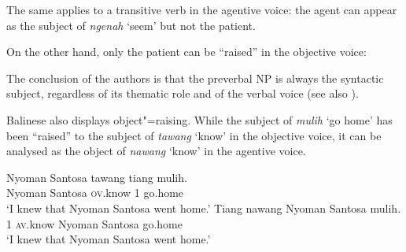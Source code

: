\documentclass[output=paper
	        ,collection
	        ,collectionchapter
 	        ,biblatex
                ,babelshorthands
                ,newtxmath
                ,draftmode
                ,colorlinks, citecolor=brown
]{./langsci/langscibook}
\begin{document}
The same applies to a transitive verb in the agentive voice: the agent can appear as the subject of \emph{ngenah} `seem' but not the patient.

\eal
{}
\zl

On the other hand, only the patient can be ``raised'' in the objective voice:

\eal
{}
\zl

The conclusion of the authors is that the preverbal NP is always the syntactic subject, regardless of its thematic role and of the verbal voice (see also \citealt{ManningandSag1998}).

Balinese also displays object"=raising. While the subject of \emph{mulih} `go home' has been ``raised'' to the
subject of \emph{tawang} `know' in the objective voice, it can be analysed as the object of \emph{nawang} `know' in the agentive
voice.

\begin{exe}
\ex \begin{xlist}
\ex 
\gll Nyoman Santosa tawang           tiang  mulih.\\
     Nyoman Santosa \textsc{ov}.know 1      go.home\\\hfill\citep[ex 22]{WechslerandArka1998}
\glt `I knew that Nyoman Santosa went home.'
\ex 
\gll Tiang nawang           Nyoman Santosa mulih.\\
     1     \textsc{av}.know Nyoman Santosa go.home\\
\glt `I knew that Nyoman Santosa went home.'
\end{xlist}
\end{exe}
\end{document}
